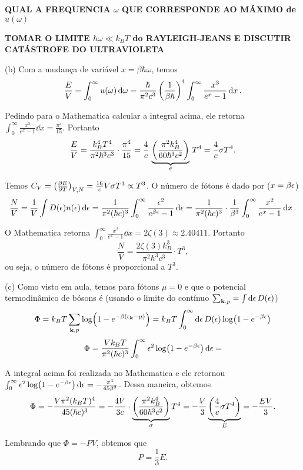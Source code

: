 \documentclass[a4paper,10pt]{article}
\begin{document}
\textbf{QUAL A FREQUENCIA $\omega$ QUE CORRESPONDE AO MÁXIMO de $u(\omega)$}

\textbf{TOMAR O LIMITE $\hbar\omega \ll k_B T$ do RAYLEIGH-JEANS E DISCUTIR CATÁSTROFE DO ULTRAVIOLETA}

\n\n

(b) Com a mudança de variável $x = \beta \hbar\omega$, temos
$$
\frac{E}{V} = \int_0^\infty u(\omega) \dd{\omega} = \frac{\hbar}{\pi^2 c^3} \,
\qty(\frac{1}{\beta\hbar})^4 \int_0^\infty \frac{x^3}{e^{x} - 1} \dd{x}.
$$

Pedindo para o Mathematica calcular a integral acima, ele retorna $\int_0^\infty \frac{x^3}{e^{x} - 1} \dd{x} = \frac{\pi^4}{15}$. Portanto
$$
\frac{E}{V} = \frac{k_B^4 T^4}{\pi^2 \hbar^3 c^3} \cdot \frac{\pi^4}{15} =
\frac{4}{c} \, \underbrace{\qty(\frac{\pi^2 k_B^4}{60 \hbar^3 c^2})}_{\sigma} \, T^4 = \frac{4}{c} \sigma T^4.
$$

Temos $C_V = \qty(\pdv{E}{T})_{V,N} = \frac{16}{c} V \sigma T^3 \propto T^3$. O número de fótons é dado por ($x = \beta \epsilon$)
$$
\frac{N}{V} = \frac{1}{V} \int D(\epsilon) n(\epsilon) \dd{\epsilon} =
\frac{1}{\pi^2 (\hbar c)^3} \int_0^{\infty} \frac{\epsilon^2}{e^{\beta \epsilon}-1} \dd{\epsilon} =
\frac{1}{\pi^2 (\hbar c)^3} \cdot \frac{1}{\beta^3} \int_0^\infty \frac{x^2}{e^x - 1} \dd{x}.
$$

O Mathematica retorna $\int_0^\infty \frac{x^2}{e^x - 1} \dd{x} = 2 \zeta(3) \approx 2.40411$. Portanto
$$
\frac{N}{V} = \frac{2 \zeta(3) k_B^3}{\pi^2 \hbar^3 c^3} \cdot T^3,
$$
ou seja, o número de fótons é proporcional a $T^3$.

\n\n

(c) Como visto em aula, temos para fótons $\mu = 0$ e que o potencial termodinâmico de bósons é (usando o limite do contínuo $\sum_{\vb{k},p} = \int \dd{\epsilon} D(\epsilon)$)
$$
\Phi = k_B T \sum_{\vb{k},p} \log(1 - e^{-\beta (\epsilon_{\vb{k}} - \mu)}) = k_B T \int_0^{\infty} \dd{\epsilon} D(\epsilon) \log(1 - e^{-\beta \epsilon})
$$
$$
\Phi = \frac{V k_B T}{\pi^2 (\hbar c)^3} \int_0^{\infty} \epsilon^2 \log(1 - e^{-\beta \epsilon}) \dd{\epsilon} =
$$

A integral acima foi realizada no Mathematica e ele retornou $\int_0^{\infty} \epsilon^2 \log(1 - e^{-\beta \epsilon}) \dd{\epsilon} = - \frac{\pi^4}{45 \beta^3}$. Dessa maneira, obtemos
$$
\Phi = -\frac{V \pi^2 (k_B T)^4}{45 (\hbar c)^3} =
- \frac{4 V}{3 c} \cdot \underbrace{\qty(\frac{\pi^2 k_B^4}{60 \hbar^3 c^2})}_{\sigma} T^4 =
- \frac{V}{3} \underbrace{\qty(\frac{4}{c} \sigma T^4)}_{E} = -\frac{E V}{3}.
$$

Lembrando que $\Phi = - PV$, obtemos que
$$
\boxed{ P = \frac{1}{3} E. }
$$
\end{document}

